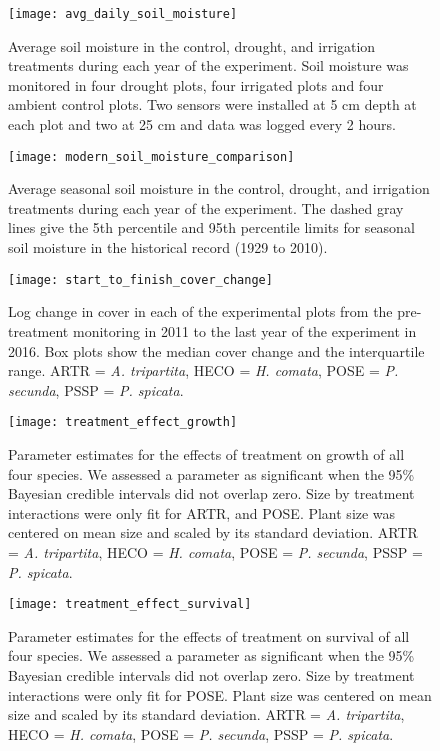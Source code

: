 \documentclass[11pt]{article}
\begin{document}
\begin{figure}[!htbp]
	\centering
	\texttt{[image: avg\_daily\_soil\_moisture]}
	\caption{Average soil moisture in the control, drought, and irrigation treatments during each year of the experiment.  Soil moisture was monitored in four drought plots, four irrigated plots and four ambient control plots. Two sensors were installed at 5 cm depth at each plot and two at 25 cm and data was logged every 2 hours.}
	\label{fig:dailyVWC}
\end{figure}


\begin{figure}[!htbp]
	\centering
	\texttt{[image: modern\_soil\_moisture\_comparison]}
	\caption{Average seasonal soil moisture in the control, drought, and irrigation treatments during each year of the experiment. The dashed gray lines give the 5th percentile and 95th percentile limits for seasonal soil moisture in the historical record (1929 to 2010). }
	\label{fig:seasonalVWC}
\end{figure}


\begin{figure}[!htbp]
	\centering
	\texttt{[image: start\_to\_finish\_cover\_change]}
	\caption{Log change in cover in each of the experimental plots from the pre-treatment monitoring in 2011 to the last year of the experiment in 2016. Box plots show the median cover change and the interquartile range. ARTR = \textit{A. tripartita}, HECO = \textit{H. comata}, POSE = \textit{P. secunda}, PSSP = \textit{P. spicata}.}
	\label{fig:coverChange}
\end{figure}

\begin{figure}[!htbp]
	\centering
	\texttt{[image: treatment\_effect\_growth]}
	\caption{Parameter estimates for the effects of treatment on growth of all four species. We assessed a parameter as significant when the 95\% Bayesian credible intervals did not overlap zero. Size by treatment interactions were only fit for ARTR, and POSE. Plant size was centered on mean size and scaled by its standard deviation. ARTR = \textit{A. tripartita}, HECO = \textit{H. comata}, POSE = \textit{P. secunda}, PSSP = \textit{P. spicata}. }
	\label{fig:growthTreat}
\end{figure}

\begin{figure}[!htbp]
	\centering
	\texttt{[image: treatment\_effect\_survival]}
	\caption{Parameter estimates for the effects of treatment on survival of all four species. We assessed a parameter as significant when the 95\% Bayesian credible intervals did not overlap zero. Size by treatment interactions were only fit for POSE. Plant size was centered on mean size and scaled by its standard deviation.  ARTR = \textit{A. tripartita}, HECO = \textit{H. comata}, POSE = \textit{P. secunda}, PSSP = \textit{P. spicata}. }
	\label{fig:survivalTreat}
\end{figure}
\end{document}
